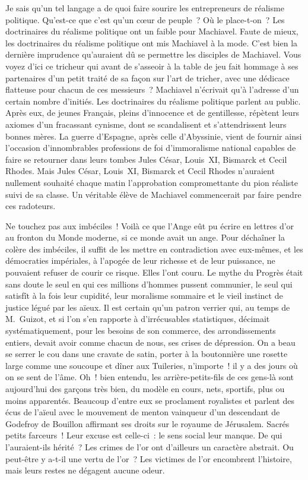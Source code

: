 \documentclass[french,twoside]{book} %
\begin{document}
\noindent Je sais qu’un tel langage a de quoi faire sourire les entrepreneurs de réalisme politique. Qu’est-ce que c’est qu’un cœur de peuple ? Où le place-t-on ? Les doctrinaires du réalisme politique ont un faible pour Machiavel. Faute de mieux, les doctrinaires du réalisme politique ont mis Machiavel à la mode. C’est bien la dernière imprudence qu’auraient dû se permettre les disciples de Machiavel. Vous voyez d’ici ce tricheur qui avant de s’asseoir à la table de jeu fait hommage à ses partenaires d’un petit traité de sa façon sur l’art de tricher, avec une dédicace flatteuse pour chacun de ces messieurs ? Machiavel n’écrivait qu’à l’adresse d’un certain nombre d’initiés. Les doctrinaires du réalisme politique parlent au public. Après eux, de jeunes Français, pleins d’innocence et de gentillesse, répètent leurs axiomes d’un fracassant cynisme, dont se scandalisent et s’attendrissent leurs bonnes mères. La guerre d’Espagne, après celle d’Abyssinie, vient de fournir ainsi l’occasion d’innombrables professions de foi d’immoralisme national capables de faire se retourner dans leurs tombes Jules César, Louis \textsc{XI}, Bismarck et Cecil Rhodes. Mais Jules César, Louis \textsc{XI}, Bismarck et Cecil Rhodes n’auraient nullement souhaité chaque matin l’approbation compromettante du pion réaliste suivi de sa classe. Un véritable élève de Machiavel commencerait par faire pendre ces radoteurs.\par
Ne touchez pas aux imbéciles ! Voilà ce que l’Ange eût pu écrire en lettres d’or au fronton du Monde moderne, si ce monde avait un ange. Pour déchaîner la colère des imbéciles, il suffit de les mettre en contradiction avec eux-mêmes, et les démocraties impériales, à l’apogée de leur richesse et de leur puissance, ne pouvaient refuser de courir ce risque. Elles l’ont couru. Le mythe du Progrès était sans doute le seul en qui ces millions d’hommes pussent communier, le seul qui satisfît à la fois leur cupidité, leur moralisme sommaire et le vieil instinct de justice légué par les aïeux. Il est certain qu’un patron verrier qui, au temps de M. Guizot, et si l’on s’en rapporte à d’irrécusables statistiques, décimait systématiquement, pour les besoins de son commerce, des arrondissements entiers, devait avoir comme chacun de nous, ses crises de dépression. On a beau se serrer le cou dans une cravate de satin, porter à la boutonnière une rosette large comme une soucoupe et dîner aux Tuileries, n’importe ! il y a des jours où on se sent de l’âme. Oh ! bien entendu, les arrière-petits-fils de ces gens-là sont aujourd’hui des garçons très bien, du modèle en cours, nets, sportifs, plus ou moins apparentés. Beaucoup d’entre eux se proclament royalistes et parlent des écus de l’aïeul avec le mouvement de menton vainqueur d’un descendant de Godefroy de Bouillon affirmant ses droits sur le royaume de Jérusalem. Sacrés petits farceurs ! Leur excuse est celle-ci : le sens social leur manque. De qui l’auraient-ils hérité ? Les crimes de l’or ont d’ailleurs un caractère abstrait. Ou peut-être y a-t-il une vertu de l’or ? Les victimes de l’or encombrent l’histoire, mais leurs restes ne dégagent aucune odeur.\par
\end{document}
